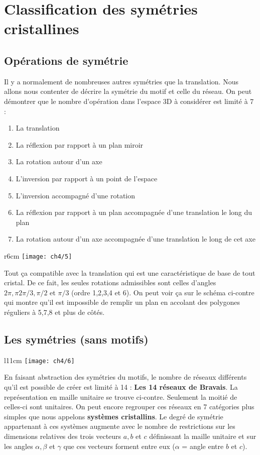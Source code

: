 \section{Classification des symétries cristallines}
	\subsection{Opérations de symétrie}
		Il y a normalement de nombreuses autres symétries que la translation. Nous allons nous contenter de décrire la symétrie du motif et celle du réseau. On peut démontrer que le nombre d'opération dans l'espace 3D à considérer est limité à 7 : 
		\begin{enumerate}
			\item La translation 
			\item La réflexion par rapport à un plan miroir
			\item La rotation autour d'un axe
			\item L'inversion par rapport à un point de l'espace
			\item L'inversion accompagné d'une rotation
			\item La réflexion par rapport à un plan accompagnée d'une translation le long du plan
			\item La rotation autour d'un axe accompagnée d'une translation le long de cet axe\\
		\end{enumerate}
	
		\begin{wrapfigure}[7]{r}{6cm}
		\vspace{-5mm}
		\texttt{[image: ch4/5]}
		\end{wrapfigure}		
		Tout ça compatible avec la translation qui est une caractéristique de base de tout cristal. De ce fait, les seules rotations admissibles sont celles d'angles $2\pi , \pi 2\pi /3 , \pi /2$ et $\pi /3$ (ordre 1,2,3,4 et 6). On peut voir ça sur le schéma ci-contre qui montre qu'il est impossible de remplir un plan en accolant des polygones réguliers à 5,7,8 et plus de côtés.
		
		\newpage
	
	\subsection{Les symétries (sans motifs)}
		\begin{wrapfigure}[12]{l}{11cm}
		\vspace{-5mm}
		\texttt{[image: ch4/6]}
		\end{wrapfigure}		
		En faisant abstraction des symétries du motifs, le nombre de réseaux différents qu'il est possible de créer est limité à 14 : \textbf{Les 14 réseaux de Bravais}. La représentation en maille unitaire se trouve ci-contre. Seulement la moitié de celles-ci sont unitaires. On peut encore regrouper ces réseaux en 7 catégories plus simples que nous appelons \textbf{systèmes cristallins}. Le degré de symétrie appartenant à ces systèmes augmente avec le nombre de restrictions sur les dimensions relatives des trois vecteurs $a,b$ et $c$ définissant la maille unitaire et sur les angles $\alpha , \beta$ et $\gamma$ que ces vecteurs forment entre eux ($\alpha$ = angle entre $b$ et $c$). 
		
